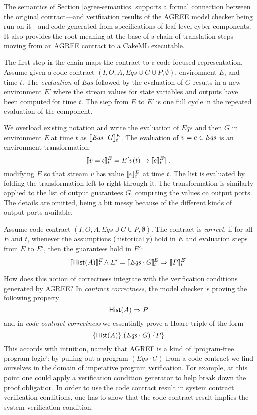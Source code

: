 The semantics of Section \ref{agree-semantics} supports a formal
connection between the original contract---and verification results of
the AGREE model checker being run on it---and code generated from
specifications of leaf level cyber-components. It also provides the
root meaning at the base of a chain of translation steps moving from
an AGREE contract to a CakeML executable.

The first step in the chain maps the contract to a code-focused
representation. Assume given a code contract
$(I,O,A,\mathit{Eqs} \cup G \cup P,\emptyset)$, environment $E$, and
time $t$. The \emph{evaluation} of $\mathit{Eqs}$ followed by the
evaluation of $G$ results in a new environment $E'$ where the stream
values for state variables and outputs have been computed for time
$t$. The step from $E$ to $E'$ is one full cycle in the repeated
evaluation of the component.

\begin{definition}[Evaluation]
We overload existing notation and write the evaluation of
$\mathit{Eqs}$ and then $G$ in environment $E$ at time $t$ as
$[\![ \mathit{Eqs}\cdot G ]\!]^E_t$. The evaluation of $v = e \in {\ensuremath{\mathit{Eqs}}}$
is an environment transformation
\[
 [\![ v = e ]\!]^E_t = E[v(t) \mapsto[\![ e ]\!]^E_t] \ .
\]
modifying $E$ so that stream $v$ has value $[\![ e ]\!]^E_t$ at time $t$.
The list {\Eqs} is evaluated by folding the transformation left-to-right
through it. The transformation is similarly applied to the list of output
guarantees $G$, computing the values on output ports. The details are
omitted, being a bit messy because of the different kinds of output
ports available.
\end{definition}


\begin{definition}
Assume code contract $(I,O,A,\mathit{Eqs} \cup G \cup P,\emptyset)$.
The contract is \emph{correct}, if for all $E$ and $t$, whenever the
assumptions (historically) hold in $E$ and evaluation steps from $E$
to $E'$, then the guarantees hold in $E'$:
\[
[\![ \mathsf{Hist}(A) ]\!]^E_t \land E' = [\![ \mathit{Eqs} \cdot G ]\!]^E_t \Rightarrow [\![ P ]\!]^{E'}_t
\]
\end{definition}

How does this notion of correctness integrate with the verification
conditions generated by AGREE? In \emph{contract correctness}, the
model checker is proving the following property
\[
\mathsf{Hist}(A) \Rightarrow P
\]
and in \emph{code contract correctness} we essentially prove a Hoare
triple of the form
\[
\{ {\mathsf{Hist}(A)} \}\; (\mathit{Eqs} \cdot G) \; \{ {P} \}
\]
This accords with intuition, namely that AGREE is a kind of
`program-free program logic'; by pulling out a program
$(\mathit{Eqs}\cdot G)$ from a code contract we find ourselves in the
domain of imperative program verification. For example, at this
point one could apply a verification condition generator to help break
down the proof obligation. In order to use the code contract result in
system contract verification conditions, one has to show that the code
contract result implies the system verification condition.

